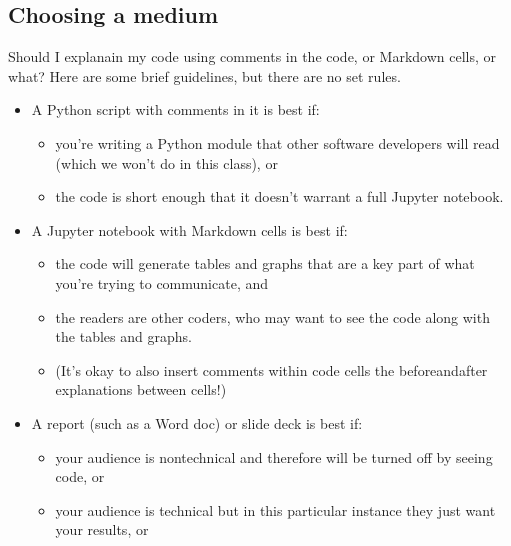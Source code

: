 \documentclass[letterpaper,10pt,english]{jupyterBook}
\begin{document}
\subsection{Choosing a medium}
\label{\detokenize{chapter-5-before-and-after:choosing-a-medium}}
\sphinxAtStartPar
Should I explanain my code using comments in the code, or Markdown cells, or what?  Here are some brief guidelines, but there are no set rules.
\begin{itemize}
\item {} 
\sphinxAtStartPar
A Python script with comments in it is best if:
\begin{itemize}
\item {} 
\sphinxAtStartPar
you’re writing a Python module that other software developers will read (which we won’t do in this class), or

\item {} 
\sphinxAtStartPar
the code is short enough that it doesn’t warrant a full Jupyter notebook.

\end{itemize}

\item {} 
\sphinxAtStartPar
A Jupyter notebook with Markdown cells is best if:
\begin{itemize}
\item {} 
\sphinxAtStartPar
the code will generate tables and graphs that are a key part of what you’re trying to communicate, and

\item {} 
\sphinxAtStartPar
the readers are other coders, who may want to see the code along with the tables and graphs.

\item {} 
\sphinxAtStartPar
(It’s okay to also insert comments within code cells  the before\sphinxhyphen{}and\sphinxhyphen{}after explanations between cells!)

\end{itemize}

\item {} 
\sphinxAtStartPar
A report (such as a Word doc) or slide deck is best if:
\begin{itemize}
\item {} 
\sphinxAtStartPar
your audience is nontechnical and therefore will be turned off by seeing code, or

\item {} 
\sphinxAtStartPar
your audience is technical but in this particular instance they just want your results, or


\end{itemize}
\end{itemize}
\end{document}

